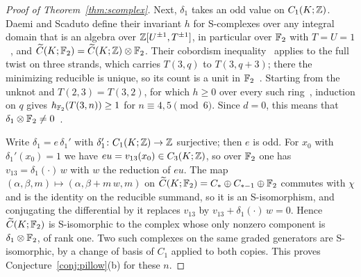 \begin{proof}[Proof of Theorem~\ref{thm:scomplex}]
Next, $\delta_1$ takes an odd value on $C_1(K;\mathbb{Z})$. Daemi and Scaduto define their invariant $h$ for S-complexes over
any integral domain that is an algebra over $\mathbb{Z}[U^{\pm1},T^{\pm1}]$, in particular over $\mathbb{F}_2$ with $T=U=1$~\cite[\S2.2]{DScaduto},
and $\widetilde C(K;\mathbb{F}_2)=\widetilde C(K;\mathbb{Z})\otimes\mathbb{F}_2$. Their cobordism inequality~\cite[Thm.~4.22, Prop.~4.30]{DScaduto} applies to the full twist
on three strands, which carries $T(3,q)$ to $T(3,q+3)$; there the minimizing reducible is unique, so its count is a unit
in $\mathbb{F}_2$~\cite[Cor.~4.8]{DScaduto}. Starting from the unknot and $T(2,3)=T(3,2)$, for which $h\ge0$ over every such
ring~\cite[\S4]{DScaduto}, induction on $q$ gives $h_{\mathbb{F}_2}(T(3,n))\ge1$ for $n\equiv4,5\pmod 6$. Since $d=0$, this means that
$\delta_1\otimes\mathbb{F}_2\neq0$~\cite[Prop.~4.15, Rem.~4.2]{DSEquiv}.

Write $\delta_1=e\,\delta_1'$ with $\delta_1'\colon C_1(K;\mathbb{Z})\to\mathbb{Z}$ surjective; then $e$ is odd. For $x_0$ with $\delta_1'(x_0)=1$ we have
$eu=v_{13}(x_0)\in C_3(K;\mathbb{Z})$, so over $\mathbb{F}_2$ one has $v_{13}=\delta_1(\cdot)\,w$ with $w$ the reduction of $eu$. The map
$(\alpha,\beta,m)\mapsto(\alpha,\beta+m\,w,m)$ on $\widetilde C(K;\mathbb{F}_2)=C_*\oplus C_{*-1}\oplus\mathbb{F}_2$ commutes with $\chi$ and is the identity on the
reducible summand, so it is an S-isomorphism, and conjugating the differential by it replaces $v_{13}$ by
$v_{13}+\delta_1(\cdot)\,w=0$. Hence $\widetilde C(K;\mathbb{F}_2)$ is S-isomorphic to the complex whose only nonzero component is
$\delta_1\otimes\mathbb{F}_2$, of rank one. Two such complexes on the same graded generators are S-isomorphic, by a change of
basis of $C_1$ applied to both copies. This proves Conjecture~\ref{conj:pillow}(b) for these $n$.
\end{proof}
